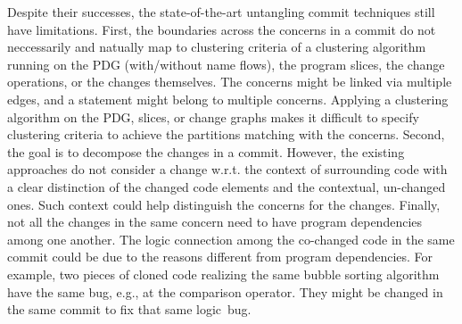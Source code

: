 

Despite their successes, the state-of-the-art untangling commit
techniques still have limitations. First, the boundaries across the
concerns in a commit do not neccessarily and natually map to
clustering criteria of a clustering algorithm running on the PDG
(with/without name flows), the program slices, the change operations,
or the changes themselves. The concerns might be linked via multiple
edges, and a statement might belong to multiple concerns. Applying a
clustering algorithm on the PDG, slices, or change graphs makes it difficult
to specify clustering criteria to achieve the partitions matching with
the concerns.
%
Second, the goal is to decompose the changes in a commit. However, the
existing approaches do not consider a change w.r.t. the context of
surrounding code with a clear distinction of the changed code elements
and the contextual, un-changed ones. Such context could help
distinguish the concerns for the changes. Finally, not all the changes
in the same concern need to have program dependencies among one
another. The logic connection among the co-changed code in the same
commit could be due to the reasons different from program
dependencies. For example, two pieces of cloned code realizing the
same bubble sorting algorithm have the same bug, e.g., at the
comparison operator. They might be changed in the same commit to fix
that same logic~bug.



